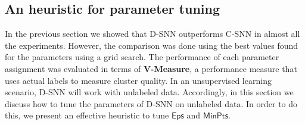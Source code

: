 \documentclass[smallextended]{svjour3}       %
\begin{document}


 

\vspace{-4 mm}
\subsection*{An heuristic for parameter tuning}

In the previous section we showed that D-SNN outperforms C-SNN in almost all the experiments. 
However, the comparison was done using the best values found for the parameters using a grid search. 
The performance of each parameter assignment was evaluated in terms of \textbf{V-Measure}, a performance measure that uses actual labels to measure cluster quality. In an unsupervised learning scenario, D-SNN will work with unlabeled data. Accordingly, in this section we discuss how to tune the parameters of D-SNN on unlabeled data. In order to do this, we present an effective heuristic to tune $\mathsf{Eps}$ and $\mathsf{MinPts}$. 
\end{document}
